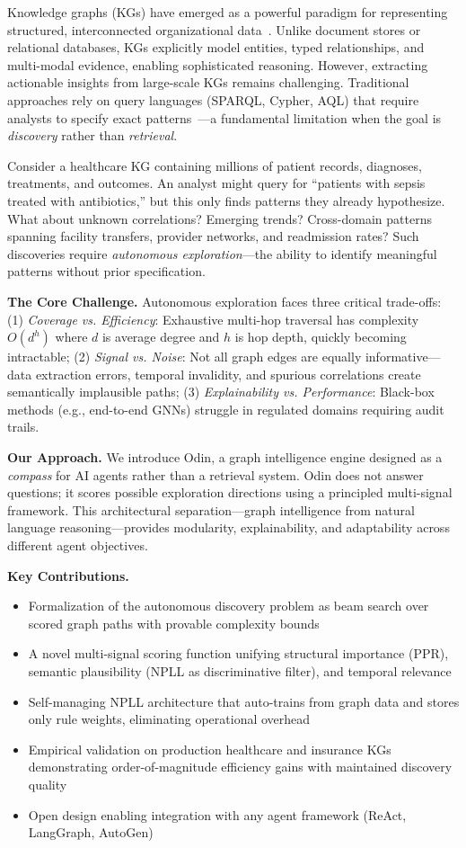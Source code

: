 \documentclass[10pt,twocolumn]{article}
\begin{document}
Knowledge graphs (KGs) have emerged as a powerful paradigm for representing structured, interconnected organizational data~\cite{paulheim2017knowledge}. Unlike document stores or relational databases, KGs explicitly model entities, typed relationships, and multi-modal evidence, enabling sophisticated reasoning. However, extracting actionable insights from large-scale KGs remains challenging. Traditional approaches rely on query languages (SPARQL, Cypher, AQL) that require analysts to specify exact patterns~\cite{angles2017foundations}---a fundamental limitation when the goal is \textit{discovery} rather than \textit{retrieval}.

Consider a healthcare KG containing millions of patient records, diagnoses, treatments, and outcomes. An analyst might query for ``patients with sepsis treated with antibiotics,'' but this only finds patterns they already hypothesize. What about unknown correlations? Emerging trends? Cross-domain patterns spanning facility transfers, provider networks, and readmission rates? Such discoveries require \textit{autonomous exploration}---the ability to identify meaningful patterns without prior specification.

\textbf{The Core Challenge.} Autonomous exploration faces three critical trade-offs: (1) \textit{Coverage vs. Efficiency}: Exhaustive multi-hop traversal has complexity $O(d^h)$ where $d$ is average degree and $h$ is hop depth, quickly becoming intractable; (2) \textit{Signal vs. Noise}: Not all graph edges are equally informative---data extraction errors, temporal invalidity, and spurious correlations create semantically implausible paths; (3) \textit{Explainability vs. Performance}: Black-box methods (e.g., end-to-end GNNs) struggle in regulated domains requiring audit trails.

\textbf{Our Approach.} We introduce Odin, a graph intelligence engine designed as a \textit{compass} for AI agents rather than a retrieval system. Odin does not answer questions; it scores possible exploration directions using a principled multi-signal framework. This architectural separation---graph intelligence from natural language reasoning---provides modularity, explainability, and adaptability across different agent objectives.

\textbf{Key Contributions.}
\begin{itemize}
\item Formalization of the autonomous discovery problem as beam search over scored graph paths with provable complexity bounds
\item A novel multi-signal scoring function unifying structural importance (PPR), semantic plausibility (NPLL as discriminative filter), and temporal relevance
\item Self-managing NPLL architecture that auto-trains from graph data and stores only rule weights, eliminating operational overhead
\item Empirical validation on production healthcare and insurance KGs demonstrating order-of-magnitude efficiency gains with maintained discovery quality
\item Open design enabling integration with any agent framework (ReAct, LangGraph, AutoGen)
\end{itemize}
\end{document}
